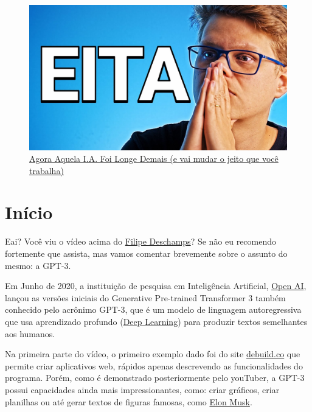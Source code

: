 \documentclass[12pt]{article}
\begin{document}
    \newpage    
    \begin{figure}[htp]
        \centering
        \includegraphics[scale=0.3]{maxresdefault.jpg}
        \caption{\href{https://youtu.be/pbVwH8o837A}{Agora Aquela I.A. Foi Longe Demais (e vai mudar o jeito que você trabalha)}}
    \end{figure}
    
    \section{Início} \label{sec:gpt-3}

    Eai? Você viu o vídeo acima do \href{https://br.linkedin.com/in/filipedeschamps}{Filipe Deschamps}? 
    Se não eu recomendo fortemente que assista, mas vamos comentar brevemente sobre o assunto 
    do mesmo: a GPT-3.

    Em Junho de 2020, a instituição de pesquisa em Inteligência Artificial,
    \href{https://openai.com/}{Open AI}, lançou as versões iniciais do Generative Pre-trained Transformer 3 também conhecido 
    pelo acrônimo GPT-3, que é um modelo de linguagem autoregressiva que usa 
    aprendizado profundo (\href{https://www.sas.com/pt_br/insights/analytics/deep-learning.html}
    {Deep Learning}) para produzir textos semelhantes aos humanos.

    Na primeira parte do vídeo, o primeiro exemplo dado foi do site \href{https://debuild.co/}{debuild.co} 
    que permite criar aplicativos web, rápidos apenas descrevendo as funcionalidades do programa. 
    Porém, como é demonstrado posteriormente pelo youTuber, a GPT-3 possui capacidades ainda mais 
    impressionantes, como: criar gráficos, criar planilhas ou até gerar textos de 
    figuras famosas, como \href{https://pt.wikipedia.org/wiki/Elon_Musk}{Elon Musk}.
\end{document}
